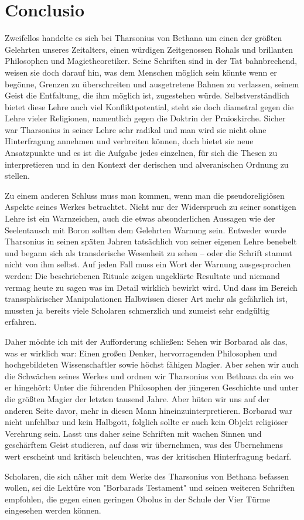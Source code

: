 \documentclass[11pt]{article}
\begin{document}
\section{Conclusio}
Zweifellos handelte es sich bei Tharsonius von Bethana um einen der größten Gelehrten unseres Zeitalters, einen würdigen Zeitgenossen Rohals und brillanten Philosophen und Magietheoretiker. Seine Schriften sind in der Tat bahnbrechend, weisen sie doch darauf hin, was dem Menschen möglich sein könnte
wenn er begönne, Grenzen zu überschreiten und ausgetretene Bahnen zu verlassen, seinem Geist die
Entfaltung, die ihm möglich ist, zugestehen würde. Selbstverständlich bietet diese Lehre auch viel Konfliktpotential, steht sie doch diametral gegen die Lehre vieler Religionen, namentlich gegen die Doktrin
der Praioskirche. Sicher war Tharsonius in seiner Lehre sehr radikal und man wird sie nicht ohne Hinterfragung annehmen und verbreiten können, doch bietet sie neue Ansatzpunkte und es ist die Aufgabe
jedes einzelnen, für sich die Thesen zu interpretieren und in den Kontext der derischen und alveranischen Ordnung zu stellen.

Zu einem anderen Schluss muss man kommen, wenn man die pseudoreligiösen Aspekte seines Werkes
betrachtet. Nicht nur der Widerspruch zu seiner sonstigen Lehre ist ein Warnzeichen, auch die etwas
absonderlichen Aussagen wie der Seelentausch mit Boron sollten dem Gelehrten Warnung sein. Entweder wurde Tharsonius in seinen späten Jahren tatsächlich von seiner eigenen Lehre benebelt und begann
sich als transderische Wesenheit zu sehen – oder die Schrift stammt nicht von ihm selbst. Auf jeden Fall
muss ein Wort der Warnung ausgesprochen werden: Die beschriebenen Rituale zeigen ungeklärte Resultate und niemand vermag heute zu sagen was im Detail wirklich bewirkt wird. Und dass im Bereich
transsphärischer Manipulationen Halbwissen dieser Art mehr als gefährlich ist, mussten ja bereits viele
Scholaren schmerzlich und zumeist sehr endgültig erfahren.

Daher möchte ich mit der Aufforderung schließen: Sehen wir Borbarad als das, was er wirklich war:
Einen großen Denker, hervorragenden Philosophen und hochgebildeten Wissenschaftler sowie höchst
fähigen Magier. Aber sehen wir auch die Schwächen seines Werkes und ordnen wir Tharsonius von Bethana da ein wo er hingehört: Unter die führenden Philosophen der jüngeren Geschichte und unter die
größten Magier der letzten tausend Jahre. Aber hüten wir uns auf der anderen Seite davor, mehr in
diesen Mann hineinzuinterpretieren. Borbarad war nicht unfehlbar und kein Halbgott, folglich sollte er
auch kein Objekt religiöser Verehrung sein. Lasst uns daher seine Schriften mit wachen Sinnen und
geschärftem Geist studieren, auf dass wir übernehmen, was des Übernehmens wert erscheint und kritisch beleuchten, was der kritischen Hinterfragung bedarf.

Scholaren, die sich näher mit dem Werke des Tharsonius von Bethana befassen wollen, sei die Lektüre
von "Borbarads Testament" und seinen weiteren Schriften empfohlen, die gegen einen geringen Obolus
in der Schule der Vier Türme eingesehen werden können.
\end{document}
